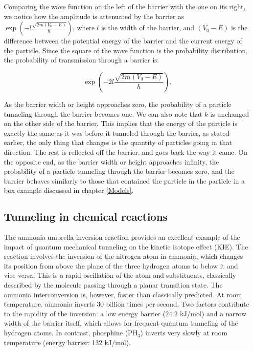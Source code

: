 \documentclass[
  english,
  9pt,
]{extbook}
\theoremstyle{definition}
\theoremstyle{definition}
\theoremstyle{definition}
\theoremstyle{definition}
\theoremstyle{remark}
\begin{document}
Comparing the wave function on the left of the barrier with the one on its right, we notice how the amplitude is attenuated by the barrier as \(\exp\left(-l\frac{\sqrt{2m(V_0-E)}}{\hbar}\right)\), where \(l\) is the width of the barrier, and \((V_0-E)\) is the difference between the potential energy of the barrier and the current energy of the particle. Since the square of the wave function is the probability distribution, the probability of transmission through a barrier is:

\begin{equation}
\exp\left(-2l\frac{\sqrt{2m(V_0-E)}}{\hbar}\right).
\label{eq:tunn6}  
\end{equation}

As the barrier width or height approaches zero, the probability of a particle tunneling through the barrier becomes one. We can also note that \(k\) is unchanged on the other side of the barrier. This implies that the energy of the particle is exactly the same as it was before it tunneled through the barrier, as stated earlier, the only thing that changes is the quantity of particles going in that direction. The rest is reflected off the barrier, and goes back the way it came. On the opposite end, as the barrier width or height approaches infinity, the probability of a particle tunneling through the barrier becomes zero, and the barrier behaves similarly to those that contained the particle in the particle in a box example discussed in chapter \ref{Models}.

\subsection{Tunneling in chemical reactions}\label{tunneling-in-chemical-reactions}

The ammonia umbrella inversion reaction provides an excellent example of the impact of quantum mechanical tunneling on the kinetic isotope effect (KIE). The reaction involves the inversion of the nitrogen atom in ammonia, which changes its position from above the plane of the three hydrogen atoms to below it and vice versa. This is a rapid oscillation of the atom and substituents, classically described by the molecule passing through a planar transition state. The ammonia interconversion is, however, faster than classically predicted. At room temperature, ammonia inverts 30 billion times per second. Two factors contribute to the rapidity of the inversion: a low energy barrier (24.2 kJ/mol) and a narrow width of the barrier itself, which allows for frequent quantum tunneling of the hydrogen atoms. In contrast, phosphine (\(\text{PH}_3\)) inverts very slowly at room temperature (energy barrier: 132 kJ/mol).
\end{document}
